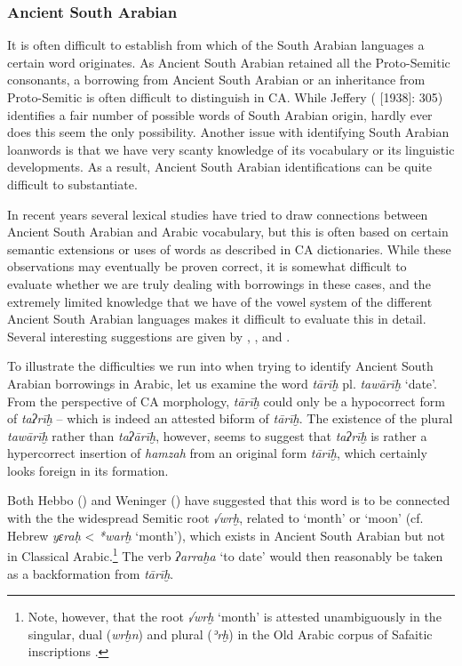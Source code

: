 \documentclass[output=paper]{langsci/langscibook}
\begin{document}
\subsubsection{\label{bkm:Ref13224682}Ancient South Arabian}

It is often difficult to establish from which of the South Arabian languages a certain word originates. As Ancient South Arabian retained all the Proto-Semitic consonants, a borrowing from Ancient South Arabian or an inheritance from Proto-Semitic is often difficult to distinguish in CA. While Jeffery (\citeyear{Jeffrey2007} [1938]: 305) identifies a fair number of possible words of South Arabian origin, hardly ever does this seem the only possibility. Another issue with identifying South Arabian loanwords is that we have very scanty knowledge of its vocabulary or its linguistic developments. As a result, Ancient South Arabian identifications can be quite difficult to substantiate.

In recent years several lexical studies have tried to draw connections between Ancient South Arabian and Arabic vocabulary, but this is often based on certain semantic extensions or uses of words as described in CA dictionaries. While these observations may eventually be proven correct, it is somewhat difficult to evaluate whether we are truly dealing with borrowings in these cases, and the extremely limited knowledge that we have of the vowel system of the different Ancient South Arabian languages makes it difficult to evaluate this in detail. Several interesting suggestions are given by  \cite{Weninger2009},  \cite{Hayajneh2011},  \cite{Elmaz2014} and  \cite{Elmaz2016}. 

To illustrate the difficulties we run into when trying to identify Ancient South Arabian borrowings in Arabic, let us examine the word \textit{tārīḫ} pl. \textit{tawārīḫ} ‘date’. From the perspective of CA morphology, \textit{tārīḫ} could only be a hypocorrect form of \textit{taʔrīḫ} – which is indeed an attested biform of \textit{tārīḫ}. The existence of the plural \textit{tawārīḫ} rather than \textit{taʔārīḫ}, however, seems to suggest that \textit{taʔrīḫ} is rather a hypercorrect insertion of \textit{hamzah} from an original form \textit{tārīḫ}, which certainly looks foreign in its formation.

Both Hebbo (\citeyear[27]{Hebbo1984}) and Weninger (\citeyear[399]{Weninger2009}) have suggested that this word is to be connected with the the widespread Semitic root \textit{√wrḫ}, related to ‘month’ or ‘moon’ (cf. Hebrew \textit{yɛraḥ} < \textit{*warḫ} ‘month’), which exists in Ancient South Arabian but not in Classical Arabic.\footnote{Note, however, that the root \textit{√wrḫ} ‘month’ is attested unambiguously in the singular, dual (\textit{wrḫn}) and plural (\textit{ʾrḫ}) in the Old Arabic corpus of Safaitic inscriptions \citep[353]{Al-Jallad2015Safaitic}.} The verb \textit{ʔarraḫa} ‘to date’ would then reasonably be taken as a backformation from \textit{tārīḫ}.
\end{document}

